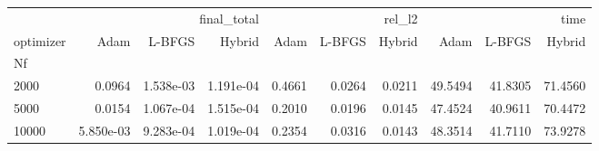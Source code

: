 \begin{tabular}{lrrrrrrrrr}
\toprule
 & \multicolumn{3}{r}{final_total} & \multicolumn{3}{r}{rel_l2} & \multicolumn{3}{r}{time} \\
optimizer & Adam & L-BFGS & Hybrid & Adam & L-BFGS & Hybrid & Adam & L-BFGS & Hybrid \\
Nf &  &  &  &  &  &  &  &  &  \\
\midrule
2000 & 0.0964 & 1.538e-03 & 1.191e-04 & 0.4661 & 0.0264 & 0.0211 & 49.5494 & 41.8305 & 71.4560 \\
5000 & 0.0154 & 1.067e-04 & 1.515e-04 & 0.2010 & 0.0196 & 0.0145 & 47.4524 & 40.9611 & 70.4472 \\
10000 & 5.850e-03 & 9.283e-04 & 1.019e-04 & 0.2354 & 0.0316 & 0.0143 & 48.3514 & 41.7110 & 73.9278 \\
\bottomrule
\end{tabular}
